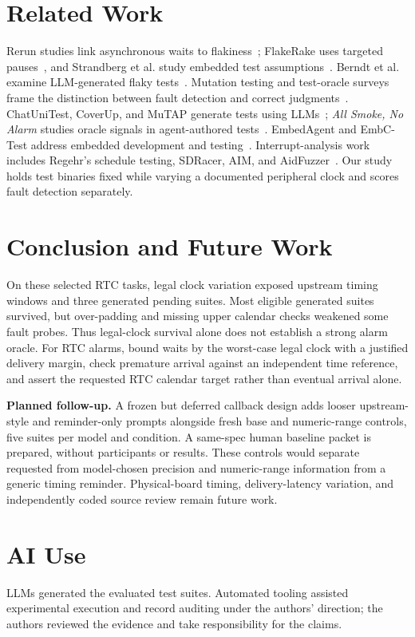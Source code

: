 \documentclass[sigconf,nonacm]{acmart}
\begin{document}
\section{Related Work}
Rerun studies link asynchronous waits to flakiness~\cite{luo2014flaky}; FlakeRake uses targeted pauses~\cite{rahman2024flakerake}, and Strandberg et al. study embedded test assumptions~\cite{strandberg2020}. Berndt et al. examine LLM-generated flaky tests~\cite{berndt2026}. Mutation testing and test-oracle surveys frame the distinction between fault detection and correct judgments~\cite{jia2011mutation,barr2015oracle}. ChatUniTest, CoverUp, and MuTAP generate tests using LLMs~\cite{chen2024chatunitest,pizzorno2025coverup,dakhel2024mutap}; \emph{All Smoke, No Alarm} studies oracle signals in agent-authored tests~\cite{banik2026}. EmbedAgent and EmbC-Test address embedded development and testing~\cite{embedagent2026,embctest2026}. Interrupt-analysis work includes Regehr's schedule testing, SDRacer, AIM, and AidFuzzer~\cite{regehr2005random,sdracer2017,aim2023,aidfuzzer2025}. Our study holds test binaries fixed while varying a documented peripheral clock and scores fault detection separately.

\section{Conclusion and Future Work}
On these selected RTC tasks, legal clock variation exposed upstream timing windows and three generated pending suites. Most eligible generated suites survived, but over-padding and missing upper calendar checks weakened some fault probes. Thus legal-clock survival alone does not establish a strong alarm oracle. For RTC alarms, bound waits by the worst-case legal clock with a justified delivery margin, check premature arrival against an independent time reference, and assert the requested RTC calendar target rather than eventual arrival alone.

\textbf{Planned follow-up.} A frozen but deferred callback design adds looser upstream-style and reminder-only prompts alongside fresh base and numeric-range controls, five suites per model and condition. A same-spec human baseline packet is prepared, without participants or results. These controls would separate requested from model-chosen precision and numeric-range information from a generic timing reminder. Physical-board timing, delivery-latency variation, and independently coded source review remain future work.

\section*{AI Use}
LLMs generated the evaluated test suites. Automated tooling assisted experimental execution and record auditing under the authors' direction; the authors reviewed the evidence and take responsibility for the claims.
\end{document}
